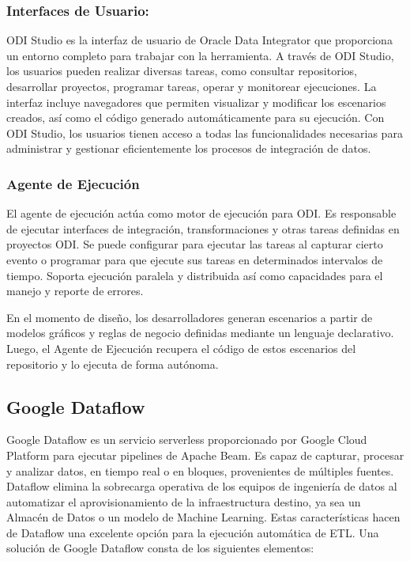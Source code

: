 \subsubsection{Interfaces de Usuario:}

ODI Studio es la interfaz de usuario de Oracle Data Integrator que proporciona un entorno completo para trabajar con la 
herramienta. A través de ODI Studio, los usuarios pueden realizar diversas tareas, como consultar repositorios, desarrollar 
proyectos, programar tareas, operar y monitorear ejecuciones. La interfaz incluye navegadores que permiten visualizar y 
modificar los escenarios creados, así como el código generado automáticamente para su ejecución. Con ODI Studio, los 
usuarios tienen acceso a todas las funcionalidades necesarias para administrar y gestionar eficientemente los procesos de 
integración de datos. 

\subsubsection{Agente de Ejecución}

El agente de ejecución actúa como motor de ejecución para ODI. Es responsable de ejecutar interfaces de integración, 
transformaciones y otras tareas definidas en proyectos ODI. Se puede configurar para ejecutar las tareas al capturar 
cierto evento o programar para que ejecute sus tareas en determinados intervalos de tiempo. Soporta ejecución paralela
y distribuida as\'i como capacidades para el manejo y reporte de errores.

En el momento de diseño, los desarrolladores generan escenarios a partir de modelos gráficos y reglas de negocio 
definidas mediante un lenguaje declarativo. Luego, el Agente de Ejecución recupera el código de estos escenarios 
del repositorio y lo ejecuta de forma autónoma. 





\subsection{Google Dataflow}

Google Dataflow es un servicio serverless proporcionado por Google Cloud Platform para ejecutar pipelines de Apache Beam. 
Es capaz de capturar, procesar y analizar datos, en tiempo real o en bloques, provenientes de m\'ultiples fuentes.
Dataflow elimina la sobrecarga operativa de los equipos de ingeniería de datos al automatizar el aprovisionamiento de la
infraestructura destino, ya sea un Almacén de Datos o un modelo de Machine Learning. Estas características hacen de 
Dataflow una excelente opción para la ejecución automática de ETL. Una solución de Google Dataflow consta de los 
siguientes elementos:


